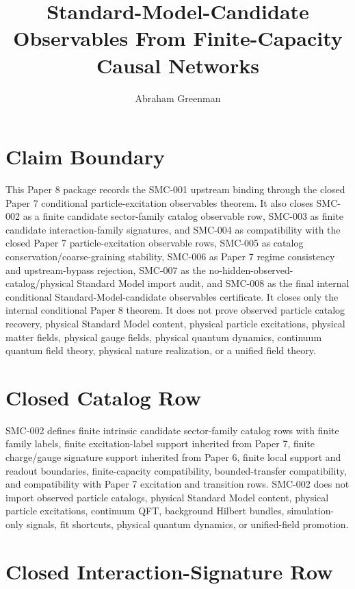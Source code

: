 \documentclass{article}
\title{Standard-Model-Candidate Observables From Finite-Capacity Causal Networks}
\author{Abraham Greenman}
\date{}
\begin{document}
\maketitle

\section{Claim Boundary}

This Paper 8 package records the SMC-001 upstream binding through the closed
Paper 7 conditional particle-excitation observables theorem. It also closes
SMC-002 as a finite candidate sector-family catalog observable row, SMC-003
as finite candidate interaction-family signatures, and SMC-004 as
compatibility with the closed Paper 7 particle-excitation observable rows,
SMC-005 as catalog conservation/coarse-graining stability, SMC-006 as Paper 7
regime consistency and upstream-bypass rejection, SMC-007 as the
no-hidden-observed-catalog/physical Standard Model import audit, and SMC-008
as the final internal conditional Standard-Model-candidate observables
certificate. It closes only the internal conditional Paper 8 theorem. It does
not prove observed particle catalog recovery, physical Standard Model
content, physical particle excitations, physical matter fields, physical
gauge fields, physical quantum dynamics, continuum quantum field theory,
physical nature realization, or a unified field theory.

\section{Closed Catalog Row}

SMC-002 defines finite intrinsic candidate sector-family catalog rows with
finite family labels, finite excitation-label support inherited from Paper 7,
finite charge/gauge signature support inherited from Paper 6, finite local
support and readout boundaries, finite-capacity compatibility,
bounded-transfer compatibility, and compatibility with Paper 7 excitation and
transition rows. SMC-002 does not import observed particle catalogs, physical
Standard Model content, physical particle excitations, continuum QFT,
background Hilbert bundles, simulation-only signals, fit shortcuts, physical
quantum dynamics, or unified-field promotion.

\section{Closed Interaction-Signature Row}
\end{document}
